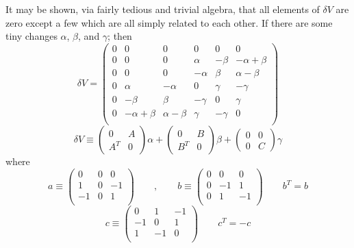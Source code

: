 \documentclass[12pt]{article}
\begin{document}
 It may be shown, via fairly tedious and trivial algebra, that all
elements of $\delta V$ are zero except a few which are all simply related
to each other.  If there are some tiny changes $\alpha$, $\beta$, and $\gamma$;
then
\begin{equation}
\delta V = \left(
\begin{array}{cccccc}
 0 &  0 &  0 &  0 &  0 &  0 \\
 0 &  0 &  0 &  \alpha &  -\beta &  -\alpha+\beta \\
 0 &  0 &  0 &  -\alpha &  \beta &  \alpha-\beta \\
 0 &  \alpha &  -\alpha &  0 &  \gamma &  -\gamma \\
 0 &  -\beta &  \beta &  -\gamma &  0 &  \gamma \\
 0 &  -\alpha+\beta &  \alpha-\beta & \gamma &  -\gamma &  0 \\
\end{array}
\right) 
\end{equation}
\begin{equation}
\delta V
\equiv \left( \begin{array}{cc} 0 & A \\ A^T & 0 \end{array} \right) \alpha +
\left( \begin{array}{cc} 0 & B \\ B^T & 0 \end{array} \right) \beta +
\left( \begin{array}{cc} 0 & 0 \\ 0 & C \end{array} \right) \gamma
\end{equation}
where
$$
a \equiv 
\left( \begin{array}{ccc} 0 & 0 & 0 \\ 1 & 0  & -1 \\ -1 & 0 & 1 \\ \end{array} \right) 
\quad \quad , \quad \quad
b \equiv 
\left( \begin{array}{ccc} 0 & 0 & 0 \\ 0 & -1 & 1 \\ 0 & 1 & -1 \\ \end{array} \right) \quad \quad
b^T = b
$$
$$
c \equiv 
\left( \begin{array}{ccc} 0 & 1 & -1 \\ -1 & 0 & 1 \\ 1 & -1 & 0 \\ \end{array} \right) \quad \quad
c^T = -c
$$
\end{document}

